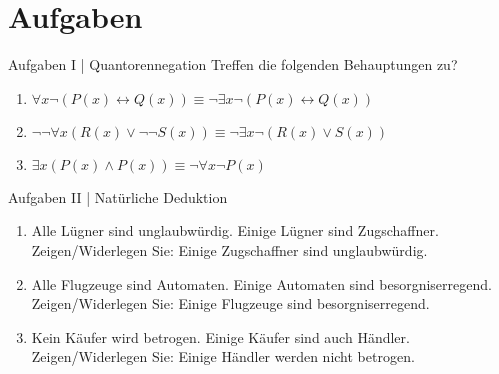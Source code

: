 \section{Aufgaben}

\begin{frame}
  {Aufgaben I | Quantorennegation}
  \onslide<+->
  \onslide<+->
  Treffen die folgenden Behauptungen zu?\\
  \Halbzeile
  \begin{enumerate}
    \item $\forall x \neg(P(x)\leftrightarrow Q(x))\equiv\neg\exists x\neg(P(x)\leftrightarrow Q(x))$
    \item $\neg\neg\forall x(R(x)\vee\neg\neg S(x))\equiv\neg\exists x\neg (R(x)\vee S(x))$
    \item $\exists x (P(x)\wedge P(x))\equiv\neg\forall x\neg P(x)$
  \end{enumerate}
\end{frame}

\begin{frame}
  {Aufgaben II | Natürliche Deduktion}
  \onslide<+->
  \begin{enumerate}
    \item Alle L\"ugner sind unglaubw\"urdig. Einige L\"ugner sind Zugschaffner. \alert{Zeigen/Widerlegen Sie: Einige Zugschaffner sind unglaubw\"urdig.}
    \item Alle Flugzeuge sind Automaten. Einige Automaten sind besorgniserregend. \alert{Zeigen/Widerlegen Sie: Einige Flugzeuge sind besorgniserregend.}
    \item Kein K\"aufer wird betrogen. Einige K\"aufer sind auch H\"andler. \alert{Zeigen/Widerlegen Sie: Einige H\"andler werden nicht betrogen.}
\end{enumerate}
 
\end{frame}

